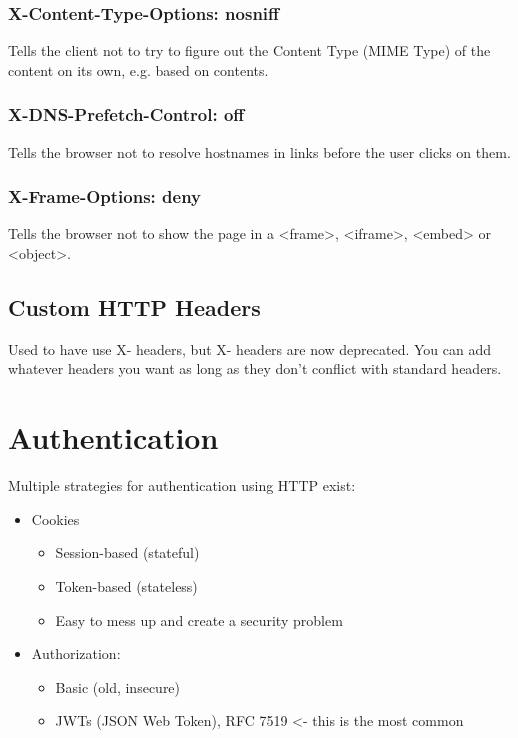 \documentclass[../CMPUT-404-Notes.tex]{subfiles}
\begin{document}
\subsubsection{X-Content-Type-Options: nosniff}
Tells the client not to try to figure out the Content Type (MIME Type) of the content on its own, e.g. based on contents.

\subsubsection{X-DNS-Prefetch-Control: off}
Tells the browser not to resolve hostnames in links before the user clicks on them.

\subsubsection{X-Frame-Options: deny}
Tells the browser not to show the page in a <frame>, <iframe>, <embed> or <object>.

\subsection{Custom HTTP Headers}
Used to have use X- headers, but X- headers are now deprecated.
You can add whatever headers you want as long as they don't conflict with standard headers.

\section{Authentication}
Multiple strategies for authentication using HTTP exist: 
\begin{itemize}
  \item   
  Cookies
  \begin{itemize}
    \item 
    Session-based (stateful)
    \item
    Token-based (stateless)
    \item
    Easy to mess up and create a security problem
  \end{itemize}
  \item
  Authorization:
  \begin{itemize}
    \item 
    Basic (old, insecure)
    \item
    JWTs (JSON Web Token), RFC 7519 <- this is the most common
  \end{itemize}
\end{itemize}
\end{document}
